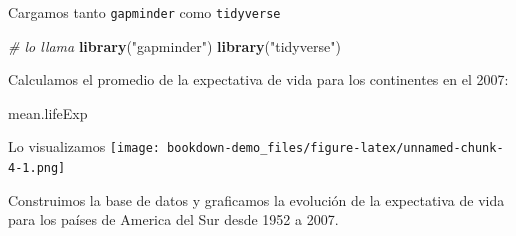 \documentclass[12pt,]{book}
\newenvironment{Shaded}{\begin{snugshade}}{\end{snugshade}}
\newcommand{\KeywordTok}[1]{\textcolor[rgb]{0.13,0.29,0.53}{\textbf{#1}}}
\newcommand{\DecValTok}[1]{\textcolor[rgb]{0.00,0.00,0.81}{#1}}
\newcommand{\StringTok}[1]{\textcolor[rgb]{0.31,0.60,0.02}{#1}}
\newcommand{\CommentTok}[1]{\textcolor[rgb]{0.56,0.35,0.01}{\textit{#1}}}
\newcommand{\OperatorTok}[1]{\textcolor[rgb]{0.81,0.36,0.00}{\textbf{#1}}}
\newcommand{\NormalTok}[1]{#1}
\begin{document}
Cargamos tanto \texttt{gapminder} como \texttt{tidyverse}

\begin{Shaded}
\begin{Highlighting}[]
\CommentTok{# lo llama}
\KeywordTok{library}\NormalTok{(}\StringTok{"gapminder"}\NormalTok{)}
\KeywordTok{library}\NormalTok{(}\StringTok{"tidyverse"}\NormalTok{)}
\end{Highlighting}
\end{Shaded}

Calculamos el promedio de la expectativa de vida para los continentes en
el 2007:

\begin{Shaded}
\end{Shaded}

\begin{Shaded}
\begin{Highlighting}[]
\NormalTok{mean.lifeExp}
\end{Highlighting}
\end{Shaded}

Lo visualizamos
\texttt{[image: bookdown-demo\_files/figure-latex/unnamed-chunk-4-1.png]}

Construimos la base de datos y graficamos la evolución de la expectativa
de vida para los países de America del Sur desde 1952 a 2007.
\end{document}
